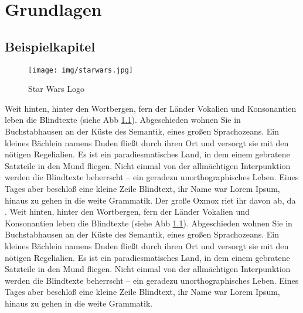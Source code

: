 \chapter{Grundlagen}
\label{sec:grundlagen}


\section{Beispielkapitel}
\label{sec:beispiel}
\begin{figure}[htb]
  \centering  
  \texttt{[image: img/starwars.jpg]}
  \caption{Star Wars Logo}
  \label{fig:starwars}
\end{figure}
Weit hinten, hinter den Wortbergen, fern der Länder Vokalien und Konsonantien leben die Blindtexte (siehe Abb \ref{fig:starwars}). Abgeschieden wohnen Sie in Buchstabhausen an der Küste des Semantik, eines großen Sprachozeans. Ein kleines Bächlein namens Duden fließt durch ihren Ort und versorgt sie mit den nötigen Regelialien. Es ist ein paradiesmatisches Land, in dem einem gebratene Satzteile in den Mund fliegen. Nicht einmal von der allmächtigen Interpunktion werden die Blindtexte beherrscht – ein geradezu unorthographisches Leben. Eines Tages aber beschloß eine kleine Zeile Blindtext, ihr Name war Lorem Ipsum, hinaus zu gehen in die weite Grammatik. Der große Oxmox riet ihr davon ab, da \cite{test}.
Weit hinten, hinter den Wortbergen, fern der Länder Vokalien und Konsonantien leben die Blindtexte (siehe Abb \ref{fig:starwars}). Abgeschieden wohnen Sie in Buchstabhausen an der Küste des Semantik, eines großen Sprachozeans. Ein kleines Bächlein namens Duden fließt durch ihren Ort und versorgt sie mit den nötigen Regelialien. Es ist ein paradiesmatisches Land, in dem einem gebratene Satzteile in den Mund fliegen. Nicht einmal von der allmächtigen Interpunktion werden die Blindtexte beherrscht – ein geradezu unorthographisches Leben. Eines Tages aber beschloß eine kleine Zeile Blindtext, ihr Name war Lorem Ipsum, hinaus zu gehen in die weite Grammatik.

